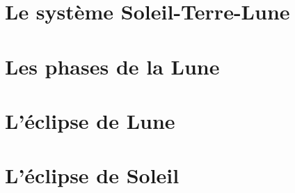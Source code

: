 \documentclass[12pt,a4paper]{article}
\date{}
\title{}
\begin{document}
	
	

\section{Le système Soleil-Terre-Lune}











\section{Les phases de la Lune}





%	
%	


\section{L'éclipse de Lune}







\section{L'éclipse de Soleil}








%
%
\end{document}
